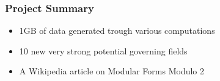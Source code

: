 \begin{frame}
	\frametitle{Project Summary}
	\begin{itemize}
		\item 1GB of data generated trough various computations
		\item 10 new very strong potential governing fields
		\item A Wikipedia article on Modular Forms Modulo 2
	\end{itemize}
\end{frame}